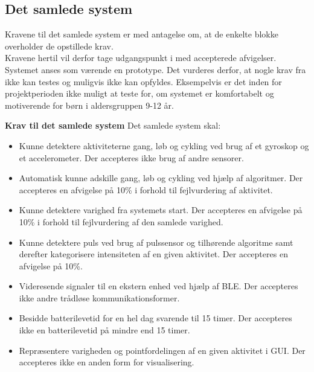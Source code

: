 \subsection{Det samlede system} \label{krav_samlet_sys}
Kravene til det samlede system er med antagelse om, at de enkelte blokke overholder de opstillede krav.\\
Kravene hertil vil derfor tage udgangspunkt i  med accepterede afvigelser. Systemet anses som værende en prototype. Det vurderes derfor, at nogle krav fra  ikke kan testes og muligvis ikke kan opfyldes. Eksempelvis er det inden for projektperioden ikke muligt at teste for, om systemet er komfortabelt og motiverende for børn i aldersgruppen 9-12 år.

\textbf{Krav til det samlede system} \newline
Det samlede system skal:
\begin{itemize}
	\item Kunne detektere aktiviteterne gang, løb og cykling ved brug af et gyroskop og et accelerometer. Der accepteres ikke brug af andre sensorer.
	\item Automatisk kunne adskille gang, løb og cykling ved hjælp af algoritmer. Der accepteres en afvigelse på 10\% i forhold til fejlvurdering af aktivitet.
	\item Kunne detektere varighed fra systemets start. Der accepteres en afvigelse på 10\% i forhold til fejlvurdering af den samlede varighed.	
	\item Kunne detektere puls ved brug af pulssensor og tilhørende algoritme samt derefter kategorisere intensiteten af en given aktivitet. Der accepteres en afvigelse på 10\%.
	\item Videresende signaler til en ekstern enhed ved hjælp af BLE. Der accepteres ikke andre trådløse kommunikationsformer.
	\item Besidde batterilevetid for en hel dag svarende til 15 timer. Der accepteres ikke en batterilevetid på mindre end 15 timer.
	\item Repræsentere varigheden og pointfordelingen af en given aktivitet i GUI. Der accepteres ikke en anden form for visualisering.	
\end{itemize}
